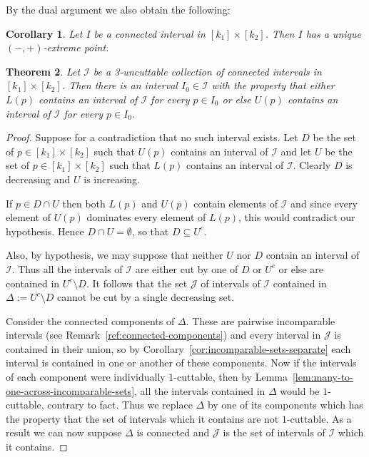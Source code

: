 \documentclass[10pt, a4paper]{article}
\theoremstyle{plain}
\newtheorem{theorem}{Theorem}[section]
\newtheorem{corollary}[theorem]{Corollary}
\theoremstyle{definition}
\newcommand{\I}{\mathcal{I}}
\newcommand{\J}{\mathcal{J}}
\begin{document}
By the dual argument we also obtain the following:

\begin{corollary}
  Let $I$ be a connected interval in $[k_1]\times[k_2]$. Then $I$ has a unique
  $(-,+)$-extreme point.
\end{corollary}


\begin{theorem}\label{thm:2d-zig-zag}
  Let $\I$ be a 3-uncuttable collection of connected intervals in $[k_1]\times [k_2]$.
  Then there is an interval $I_0 \in \I$ with the property that
  either $L(p)$ contains an interval of $\I$ for every $p\in I_0$
  or else $U(p)$ contains an interval of $\I$ for every $p\in I_0$.
\end{theorem}

\begin{proof}
  Suppose for a contradiction that no such interval exists.
  Let $D$ be the set of $p\in[k_1]\times[k_2]$ such that $U(p)$ contains an interval
  of $\I$ and let $U$ be the set of $p\in[k_1]\times[k_2]$ such that $L(p)$ contains
  an interval of $\I$. Clearly $D$ is decreasing and $U$ is increasing.

  If $p\in D\cap U$ then both $L(p)$ and $U(p)$ contain elements of $\I$
  and since every element of $U(p)$ dominates every element of $L(p)$, this
  would contradict our hypothesis.
  Hence $D\cap U = \emptyset$, so that $D\subseteq U^c$.

  Also, by hypothesis, we may suppose that neither $U$ nor $D$ contain an interval of $\I$.
  Thus all the intervals of $\I$ are either cut by one of $D$ or $U^c$
  or else are contained in $U^c\setminus D$. It follows that the set $\J$ of intervals
  of $\I$ contained in $\Delta := U^c\setminus D$ cannot be cut by a single decreasing set.

  Consider the connected components of $\Delta$. These are pairwise incomparable intervals
  (see Remark~\ref{ref:connected-components}) and every
  interval in $\J$ is contained in their union, so by Corollary~\ref{cor:incomparable-sets-separate}
  each interval is contained in one or another of these components. Now if the intervals
  of each component were individually $1$-cuttable, then by
  Lemma~\ref{lem:many-to-one-across-incomparable-sets}, all the intervals contained
  in $\Delta$ would be $1$-cuttable, contrary to fact. Thus we replace $\Delta$ by one of its
  components which has the property that the set of intervals which it contains
  are not $1$-cuttable. As a result we can now suppose $\Delta$ is connected and $\J$
  is the set of intervals of $\I$ which it contains.


\end{proof}
\end{document}
